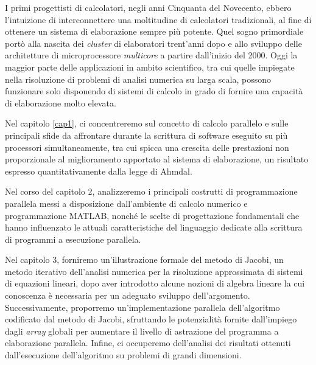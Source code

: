I primi progettisti di calcolatori, negli anni Cinquanta del Novecento, ebbero l'intuizione di interconnettere
una moltitudine di calcolatori tradizionali, al fine di ottenere un sistema di elaborazione sempre più potente.\newline
Quel sogno primordiale port\`o alla nascita dei \textit{cluster} di elaboratori trent'anni dopo e allo sviluppo delle architetture di microprocessore
\textit{multicore} a partire dall'inizio del 2000.\newline
Oggi la maggior parte delle applicazioni in ambito scientifico, tra cui quelle impiegate nella risoluzione di problemi di analisi numerica
su larga scala, possono funzionare solo disponendo di sistemi di calcolo in grado di fornire una capacit\`a di elaborazione molto elevata.

Nel capitolo \ref{cap1}, ci concentreremo sul concetto di calcolo parallelo e sulle principali sfide da affrontare
durante la scrittura di software eseguito su pi\`u processori simultaneamente, tra cui spicca una crescita delle prestazioni non proporzionale
al miglioramento apportato al sistema di elaborazione, un risultato espresso quantitativamente dalla legge di Ahmdal.

Nel corso del capitolo 2, analizzeremo i principali costrutti di programmazione parallela messi a disposizione dall’ambiente di calcolo numerico
e programmazione MATLAB\textsuperscript{\textregistered}, nonch\'e le scelte di progettazione fondamentali che hanno influenzato
le attuali caratteristiche del linguaggio dedicate alla scrittura di programmi a esecuzione parallela.

Nel capitolo 3, forniremo un'illustrazione formale del metodo di Jacobi, un metodo iterativo dell’analisi numerica per la risoluzione
approssimata di sistemi di equazioni lineari, dopo aver introdotto alcune nozioni di algebra lineare la cui conoscenza \`e necessaria per un adeguato
sviluppo dell'argomento.\newline
Successivamente, proporremo un’implementazione parallela dell'algoritmo codificato dal metodo di Jacobi, sfruttando le potenzialità fornite
dall'impiego dagli \textit{array} globali per aumentare il livello di astrazione del programma a elaborazione parallela.\newline
Infine, ci occuperemo dell’analisi dei risultati ottenuti dall’esecuzione dell’algoritmo su problemi di grandi dimensioni.
